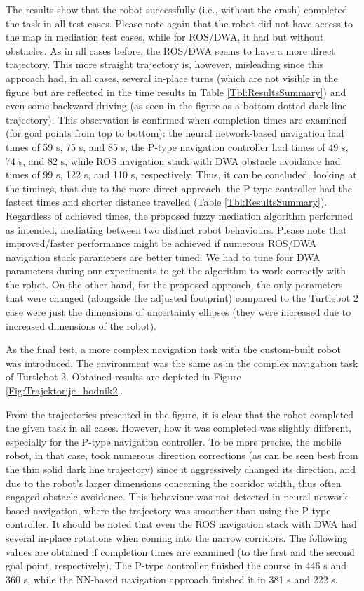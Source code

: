 The results show that the robot successfully (i.e., without the crash) completed the task in all test cases. Please note again that the robot did not have access to the map in mediation test cases, while for ROS/DWA, it had but without obstacles. As in all cases before, the ROS/DWA seems to have a more direct trajectory. This more straight trajectory is, however, misleading since this approach had, in all cases, several in-place turns (which are not visible in the figure but are reflected in the time results in Table \ref{Tbl:ResultsSummary}) and even some backward driving (as seen in the figure as a bottom dotted dark line trajectory). This observation is confirmed when completion times are examined (for goal points from top to bottom): the neural network-based navigation had times of 59 s, 75 s, and 85 s, the P-type navigation controller had times of 49 s, 74 s, and 82 s, while ROS navigation stack with DWA obstacle avoidance had times of 99 s, 122 s, and 110 s, respectively. Thus, it can be concluded, looking at the timings, that due to the more direct approach, the P-type controller had the fastest times and shorter distance travelled (Table \ref{Tbl:ResultsSummary}). Regardless of achieved times, the proposed fuzzy mediation algorithm performed as intended, mediating between two distinct robot behaviours. Please note that improved/faster performance might be achieved if numerous ROS/DWA navigation stack parameters are better tuned. We had to tune four DWA parameters during our experiments to get the algorithm to work correctly with the robot. On the other hand, for the proposed approach, the only parameters that were changed (alongside the adjusted footprint) compared to the Turtlebot 2 case were just the dimensions of uncertainty ellipses (they were increased due to increased dimensions of the robot).

As the final test, a more complex navigation task with the custom-built robot was introduced. The environment was the same as in the complex navigation task of Turtlebot 2. Obtained results are depicted in Figure \ref{Fig:Trajektorije_hodnik2}.

From the trajectories presented in the figure, it is clear that the robot completed the given task in all cases. However, how it was completed was slightly different, especially for the P-type navigation controller. To be more precise, the mobile robot, in that case, took numerous direction corrections (as can be seen best from the thin solid dark line trajectory) since it aggressively changed its direction, and due to the robot's larger dimensions concerning the corridor width, thus often engaged obstacle avoidance. This behaviour was not detected in neural network-based navigation, where the trajectory was smoother than using the P-type controller. It should be noted that even the ROS navigation stack with DWA had several in-place rotations when coming into the narrow corridors. The following values are obtained if completion times are examined (to the first and the second goal point, respectively). The P-type controller finished the course in 446 s and 360 s, while the NN-based navigation approach finished it in 381 s and 222 s.

